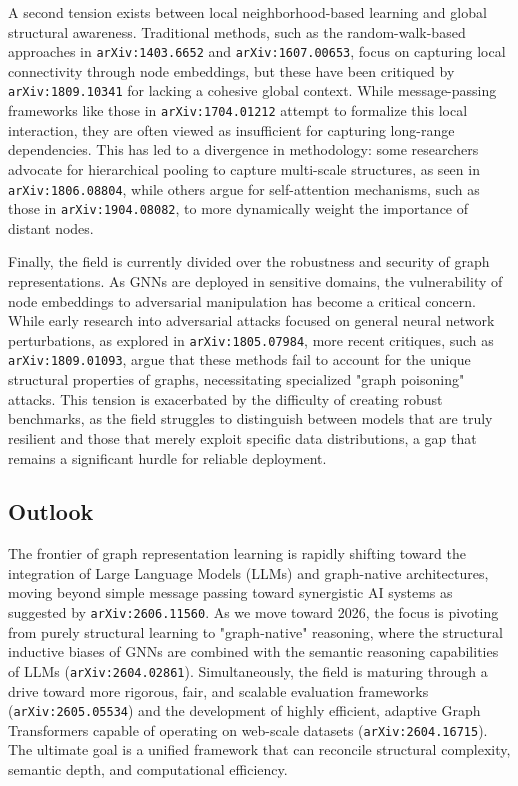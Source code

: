 \documentclass[11pt]{article}
\begin{document}
A second tension exists between local neighborhood-based learning and global structural awareness. Traditional methods, such as the random-walk-based approaches in \texttt{arXiv:1403.6652} and \texttt{arXiv:1607.00653}, focus on capturing local connectivity through node embeddings, but these have been critiqued by \texttt{arXiv:1809.10341} for lacking a cohesive global context. While message-passing frameworks like those in \texttt{arXiv:1704.01212} attempt to formalize this local interaction, they are often viewed as insufficient for capturing long-range dependencies. This has led to a divergence in methodology: some researchers advocate for hierarchical pooling to capture multi-scale structures, as seen in \texttt{arXiv:1806.08804}, while others argue for self-attention mechanisms, such as those in \texttt{arXiv:1904.08082}, to more dynamically weight the importance of distant nodes.

Finally, the field is currently divided over the robustness and security of graph representations. As GNNs are deployed in sensitive domains, the vulnerability of node embeddings to adversarial manipulation has become a critical concern. While early research into adversarial attacks focused on general neural network perturbations, as explored in \texttt{arXiv:1805.07984}, more recent critiques, such as \texttt{arXiv:1809.01093}, argue that these methods fail to account for the unique structural properties of graphs, necessitating specialized "graph poisoning" attacks. This tension is exacerbated by the difficulty of creating robust benchmarks, as the field struggles to distinguish between models that are truly resilient and those that merely exploit specific data distributions, a gap that remains a significant hurdle for reliable deployment.

\subsection{Outlook}

The frontier of graph representation learning is rapidly shifting toward the integration of Large Language Models (LLMs) and graph-native architectures, moving beyond simple message passing toward synergistic AI systems as suggested by \texttt{arXiv:2606.11560}. As we move toward 2026, the focus is pivoting from purely structural learning to "graph-native" reasoning, where the structural inductive biases of GNNs are combined with the semantic reasoning capabilities of LLMs (\texttt{arXiv:2604.02861}). Simultaneously, the field is maturing through a drive toward more rigorous, fair, and scalable evaluation frameworks (\texttt{arXiv:2605.05534}) and the development of highly efficient, adaptive Graph Transformers capable of operating on web-scale datasets (\texttt{arXiv:2604.16715}). The ultimate goal is a unified framework that can reconcile structural complexity, semantic depth, and computational efficiency.
\end{document}
